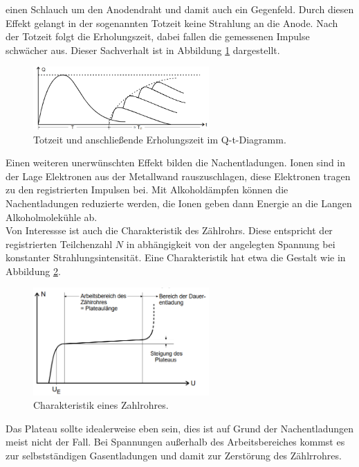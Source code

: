 einen Schlauch um den Anodendraht und damit auch ein Gegenfeld. Durch diesen Effekt gelangt in der sogenannten Totzeit keine Strahlung
an die Anode. Nach der Totzeit folgt die Erholungszeit, dabei fallen die gemessenen Impulse schwächer aus. Dieser Sachverhalt ist in Abbildung
\ref{fig:totzeit} dargestellt.
\begin{figure}
  \centering
  \includegraphics[width=0.6\textwidth]{tz.PNG}
  \caption{Totzeit und anschließende Erholungszeit im Q-t-Diagramm.}
  \label{fig:totzeit}
\end{figure}
Einen weiteren unerwünschten Effekt bilden die Nachentladungen. Ionen sind in der Lage Elektronen aus der Metallwand rauszuschlagen,
diese Elektronen tragen zu den registrierten Impulsen bei. Mit Alkoholdämpfen können die Nachentladungen reduzierte werden, die
Ionen geben dann Energie an die Langen Alkoholmolekühle ab.\\
Von Interessse ist auch die Charakteristik des Zählrohrs. Diese entspricht der registrierten Teilchenzahl $N$ in abhängigkeit von der
angelegten Spannung bei konstanter Strahlungsintensität. Eine Charakteristik hat etwa die Gestalt wie in Abbildung \ref{fig:char}.
\begin{figure}
  \centering
  \includegraphics[width=0.6\textwidth]{char.PNG}
  \caption{Charakteristik eines Zahlrohres.}
  \label{fig:char}
\end{figure}
Das Plateau sollte idealerweise eben sein, dies ist auf Grund der Nachentladungen meist nicht der Fall.
Bei Spannungen außerhalb des Arbeitsbereiches kommst es zur selbstständigen Gasentladungen und damit zur Zerstörung des Zählrrohres.
